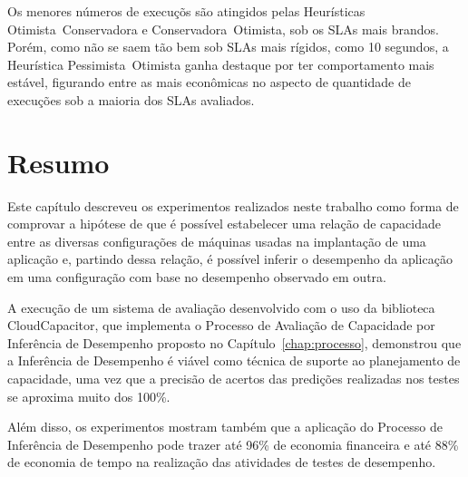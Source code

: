 Os menores números de execuçõs são atingidos pelas Heurísticas Otimista~Conservadora 
e Conservadora~Otimista, sob os SLAs mais brandos. Porém, como não se saem tão 
bem sob SLAs mais rígidos, como 10 segundos, a Heurística Pessimista~Otimista
ganha destaque por ter comportamento mais estável, figurando entre as mais 
econômicas no aspecto de quantidade de execuções sob a maioria dos SLAs avaliados.
 
\section{Resumo}
Este capítulo descreveu os experimentos realizados neste trabalho como forma de
comprovar a hipótese de que é possível estabelecer uma relação de capacidade
entre as diversas configurações de máquinas usadas na implantação de uma aplicação
e, partindo dessa relação, é possível inferir o desempenho da aplicação em uma
configuração com base no desempenho observado em outra.

A execução de um sistema de avaliação desenvolvido com o uso da biblioteca 
CloudCapacitor, que implementa o Processo de Avaliação de Capacidade
por Inferência de Desempenho proposto no Capítulo~\ref{chap:processo}, demonstrou
que a Inferência de Desempenho é viável como técnica de suporte ao 
planejamento de capacidade, uma vez que a precisão de acertos das predições 
realizadas nos testes se aproxima muito dos 100\%.

Além disso, os experimentos mostram também que a aplicação do Processo de Inferência 
de Desempenho pode trazer até 96\% de economia financeira e até 88\% de economia 
de tempo na realização das atividades de testes de desempenho.

